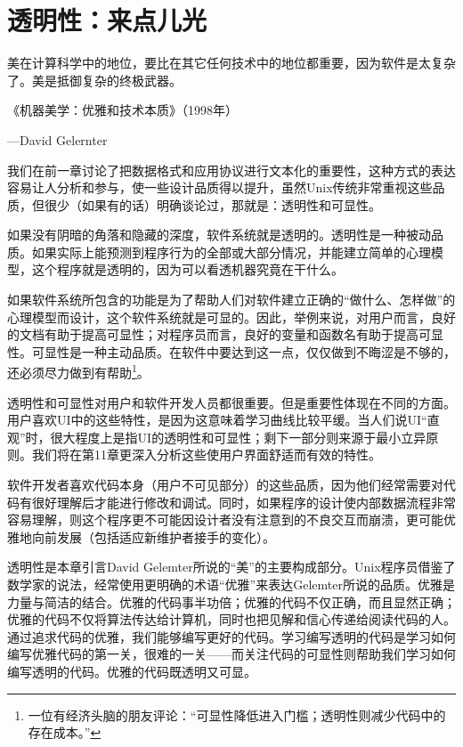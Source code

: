 \documentclass[12pt,oneside]{book}
\begin{document}
\chapter{透明性：来点儿光}
\begin{flushright}
美在计算科学中的地位，要比在其它任何技术中的地位都重要，因为软件是太复杂了。美是抵御复杂的终极武器。

{\hfill 《机器美学：优雅和技术本质》（1998年）}
    
{\hfill —David Gelernter}
\end{flushright}

我们在前一章讨论了把数据格式和应用协议进行文本化的重要性，这种方式的表达容易让人分析和参与，使一些设计品质得以提升，虽然Unix传统非常重视这些品质，但很少（如果有的话）明确谈论过，那就是：透明性和可显性。

如果没有阴暗的角落和隐藏的深度，软件系统就是透明的。透明性是一种被动品质。如果实际上能预测到程序行为的全部或大部分情况，并能建立简单的心理模型，这个程序就是透明的，因为可以看透机器究竟在干什么。

如果软件系统所包含的功能是为了帮助人们对软件建立正确的“做什么、怎样做”的心理模型而设计，这个软件系统就是可显的。因此，举例来说，对用户而言，良好的文档有助于提高可显性；对程序员而言，良好的变量和函数名有助于提高可显性。可显性是一种主动品质。在软件中要达到这一点，仅仅做到不晦涩是不够的，还必须尽力做到有帮助\footnote{一位有经济头脑的朋友评论：“可显性降低进入门槛；透明性则减少代码中的存在成本。”}。

透明性和可显性对用户和软件开发人员都很重要。但是重要性体现在不同的方面。用户喜欢UI中的这些特性，是因为这意味着学习曲线比较平缓。当人们说UI“直观”时，很大程度上是指UI的透明性和可显性；剩下一部分则来源于最小立异原则。我们将在第11章更深入分析这些使用户界面舒适而有效的特性。

软件开发者喜欢代码本身（用户不可见部分）的这些品质，因为他们经常需要对代码有很好理解后才能进行修改和调试。同时，如果程序的设计使内部数据流程非常容易理解，则这个程序更不可能因设计者没有注意到的不良交互而崩溃，更可能优雅地向前发展（包括适应新维护者接手的变化）。

透明性是本章引言David Gelemter所说的“美”的主要构成部分。Unix程序员借鉴了数学家的说法，经常使用更明确的术语“优雅”来表达Gelemter所说的品质。优雅是力量与简洁的结合。优雅的代码事半功倍；优雅的代码不仅正确，而且显然正确；优雅的代码不仅将算法传达给计算机，同时也把见解和信心传递给阅读代码的人。通过追求代码的优雅，我们能够编写更好的代码。学习编写透明的代码是学习如何编写优雅代码的第一关，很难的一关——而关注代码的可显性则帮助我们学习如何编写透明的代码。优雅的代码既透明又可显。
\end{document}
